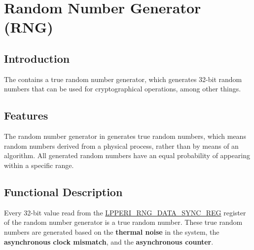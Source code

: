 \documentclass[main\_\_EN.tex]{subfiles}
\begin{document}

\ifglobal
\else
    \listoftodos
    {\let\clearpage\relax \listofdonetodos}
    \tableofcontents
\fi



\hypertarget{rng}{}
\chapter{Random Number Generator (RNG)}\label{mod:rng}

\section{Introduction}

The \chipname{} contains a true random number generator, which generates 32-bit random numbers that can be used for cryptographical operations, among other things.

\section{Features}

The random number generator in \chipname{} generates true random numbers, which means random numbers derived from a physical process, rather than by means of an algorithm. All generated random numbers have an equal probability of appearing within a specific range.

\section{Functional Description}\label{sec:rng-func-descr}

Every 32-bit value read from the \hyperref[regdesc:LPPERIRNGDATASYNCREG]{LPPERI\_RNG\_DATA\_SYNC\_REG} register of the random number generator is a true random number. These true random numbers are generated based on the \textbf{thermal noise} in the system, the \textbf{asynchronous clock mismatch}, and the \textbf{asynchronous counter}.
\end{document}

